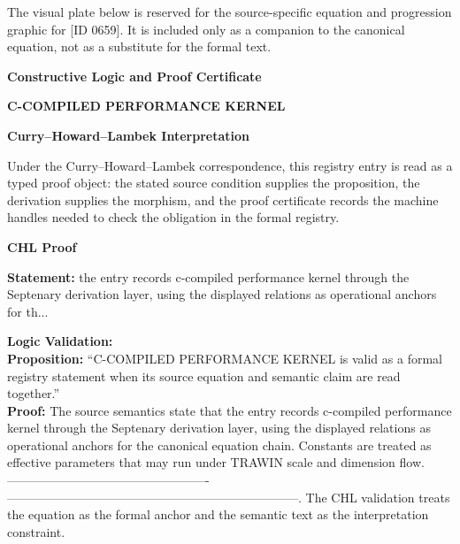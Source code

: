 \begingroup\footnotesize\sloppy
The visual plate below is reserved for the source-specific equation and progression graphic for [ID 0659]. It is included only as a companion to the canonical equation, not as a substitute for the formal text.
\par\endgroup
\ifTZPDarkEdition
{}
\fi

\clearpage
\begingroup\tzpsupportsetup
\noindent\textbf{\fontsize{10.8pt}{12.8pt}\selectfont [ID 0659] Constructive Logic and Proof Certificate}\par
\noindent\textbf{\fontsize{10pt}{12pt}\selectfont C-COMPILED PERFORMANCE KERNEL}\par
\vspace{0.45em}
\begingroup
\footnotesize
\setlength{\parskip}{0.22em}
\setlength{\parindent}{0pt}
\noindent\textbf{Curry--Howard--Lambek Interpretation}\par
Under the Curry--Howard--Lambek correspondence, this registry entry is read as a typed proof
object: the stated source condition supplies the proposition, the derivation supplies the
morphism, and the proof certificate records the machine handles needed to check the obligation
in the formal registry.

\vspace{0.45em}
\noindent\textbf{CHL Proof}\par
\textbf{Statement:} the entry records c-compiled performance kernel through the Septenary derivation layer,
using the displayed relations as operational anchors for th...

\textbf{Logic Validation:}\\
\textbf{Proposition:} ``C-COMPILED PERFORMANCE KERNEL is valid as a formal registry statement when its source
equation and semantic claim are read together.''\\
\textbf{Proof:} The source semantics state that the entry records c-compiled performance kernel through
the Septenary derivation layer, using the displayed relations as operational anchors for
the canonical equation chain. Constants are treated as effective parameters that may run
under TRAWIN scale and dimension flow. -------------------------------------------------
-----------------------------------------------------------------------. The CHL
validation treats the equation as the formal anchor and the semantic text as the
interpretation constraint.


